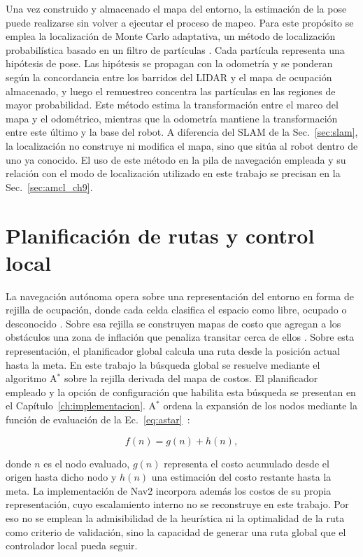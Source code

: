 Una vez construido y almacenado el mapa del entorno, la estimación de la pose
puede realizarse sin volver a ejecutar el proceso de mapeo. Para este propósito
se emplea la localización de Monte Carlo adaptativa, un método de localización
probabilística basado en un filtro de partículas
\citep{thrun2005probabilistic}.
Cada partícula representa una hipótesis de pose. Las hipótesis se propagan con la odometría y se ponderan según la concordancia entre los barridos del \gls{LIDAR} y el mapa de ocupación almacenado, y luego el remuestreo concentra las partículas en las regiones de mayor probabilidad. Este método estima la transformación entre el marco del mapa y el odométrico, mientras que la odometría mantiene la transformación entre este último y la base del robot. A diferencia del SLAM de la Sec.~\ref{sec:slam}, la localización no construye ni modifica el mapa, sino que sitúa al robot dentro de uno ya conocido. El uso de este método en la pila de navegación empleada y su relación con el
modo de localización utilizado en este trabajo se precisan en la
Sec.~\ref{sec:amcl_ch9}.

\section{Planificación de rutas y control local}
\label{sec:nav_marco}

La navegación autónoma opera sobre una representación del entorno en forma de
rejilla de ocupación, donde cada celda clasifica el espacio como libre, ocupado
o desconocido \citep[Sec.~V]{macenski2023desks}. Sobre esa rejilla se construyen mapas de costo que agregan a los obstáculos una zona de inflación que penaliza
transitar cerca de ellos \citep{nav2_doc}. Sobre esta representación, el planificador global calcula una ruta desde la posición actual hasta la
meta. En este trabajo la búsqueda global se resuelve mediante el algoritmo A$^*$ sobre la rejilla derivada del mapa de costos. El planificador empleado y la opción de configuración que habilita esta búsqueda se presentan en el
Capítulo~\ref{ch:implementacion}. A$^*$ ordena la expansión de
los nodos mediante la función de evaluación de la Ec.~\eqref{eq:astar}~\citep[Sec.~2.2.2]{lavalle2006planning}:

\begin{equation}
f(n)=g(n)+h(n),
\label{eq:astar}
\end{equation}

\noindent donde $n$ es el nodo evaluado, $g(n)$ representa el costo acumulado
desde el origen hasta dicho nodo y $h(n)$ una estimación del costo restante
hasta la meta. La implementación de Nav2 incorpora además los costos de su propia representación, cuyo escalamiento interno no se reconstruye en este trabajo. Por eso no se emplean la admisibilidad de la heurística ni la optimalidad de la ruta como criterio de validación, sino la capacidad de generar una ruta global que el controlador local pueda seguir.

